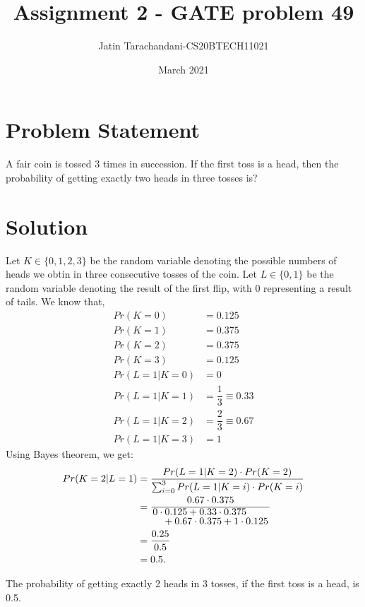 \documentclass[twocolumn]{article}
\title{Assignment 2 - GATE problem 49}
\author{Jatin Tarachandani-CS20BTECH11021}
\date{March 2021}
\begin{document}
\maketitle
\section{Problem Statement}
A fair coin is tossed 3 times in succession. If the first toss is a head, then the probability of getting exactly two heads in three tosses is?
\section{Solution}
Let $K \in \{0, 1, 2, 3\}$ be the random variable denoting the possible numbers of heads we obtin in three consecutive tosses of the coin. Let $L \in \{0, 1\}$ be the random variable denoting the result of the first flip, with 0 representing a result of tails.
We know that,
\begin{align}
    Pr(K=0)&=0.125\\
    Pr(K=1)&=0.375\\
    Pr(K=2)&=0.375\\
    Pr(K=3)&=0.125\\
    Pr(L=1|K=0)&=0\\
    Pr(L=1|K=1)&=\dfrac{1}{3} \equiv 0.33\\
    Pr(L=1|K=2)&=\dfrac{2}{3} \equiv 0.67\\
    Pr(L=1|K=3)&=1
\end{align}
Using Bayes theorem, we get:
\begin{align*}
    Pr(K=2|L=1)&=\frac{Pr(L=1|K=2)\cdot Pr(K=2)}{\sum_{i=0}^{3} Pr(L=1|K=i)\cdot Pr(K=i)}\\
    &=\frac{0.67\cdot 0.375}{\splitfrac{0\cdot0.125+0.33\cdot 0.375}{+0.67\cdot 0.375+1\cdot 0.125}}\\
    &=\frac{0.25}{0.5}\\
    &=0.5.
\end{align*}

The probability of getting exactly 2 heads in 3 tosses, if the first toss is a head, is 0.5.
\end{document}
